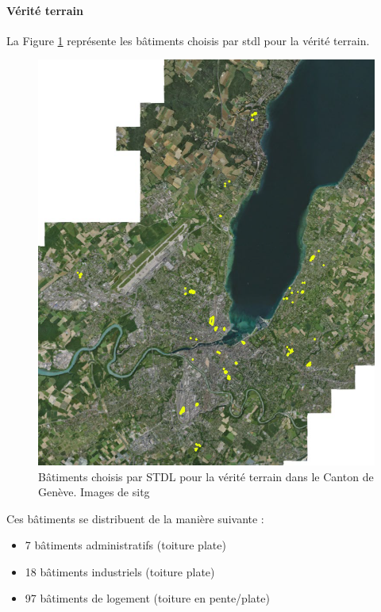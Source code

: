 {\paragraph{Vérité terrain}
\par{La Figure \ref{fig:stdl_02_verite_terrain} représente les bâtiments choisis par \acrshort{stdl} pour la vérité terrain.
\begin{figure}[H]
    \centering
    \includegraphics[width=1\linewidth]{02-main//figures/stdl_02_verite_terrain.png}
    \caption{Bâtiments choisis par STDL pour la vérité terrain dans le Canton de Genève. Images de \acrshort{sitg}}
    \label{fig:stdl_02_verite_terrain}
\end{figure}
\par{Ces bâtiments se distribuent de la manière suivante :}
\begin{itemize}
    \item 7 bâtiments administratifs (toiture plate)
    \item 18 bâtiments industriels (toiture plate)
    \item 97 bâtiments de logement (toiture en pente/plate)

\end{itemize}}}
